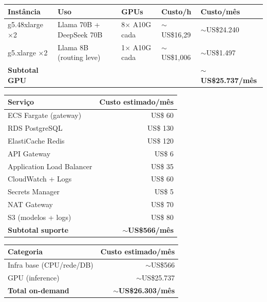 \documentclass[12pt,a4paper,]{abntex2}
\begin{document}
\begin{table}[h]
\centering
\begin{tabular}{|l|l|l|l|l|}
\hline
\textbf{Instância} & \textbf{Uso} & \textbf{GPUs} & \textbf{Custo/h} & \textbf{Custo/mês} \\
\hline
g5.48xlarge ×2 & Llama 70B + DeepSeek 70B & 8× A10G cada & $\sim$US\$16,29 & $\sim$US\$24.240 \\
g5.xlarge ×2 & Llama 8B (routing leve) & 1× A10G cada & $\sim$US\$1,006 & $\sim$US\$1.497 \\
\hline
\textbf{Subtotal GPU} & & & & \textbf{$\sim$US\$25.737/mês} \\
\hline
\end{tabular}
\end{table}

\begin{table}[h]
\centering
\begin{tabular}{|l|r|}
\hline
\textbf{Serviço} & \textbf{Custo estimado/mês} \\
\hline
ECS Fargate (gateway) & US\$ 60 \\
RDS PostgreSQL & US\$ 130 \\
ElastiCache Redis & US\$ 120 \\
API Gateway & US\$ 6 \\
Application Load Balancer & US\$ 35 \\
CloudWatch + Logs & US\$ 60 \\
Secrets Manager & US\$ 5 \\
NAT Gateway & US\$ 70 \\
S3 (modelos + logs) & US\$ 80 \\
\hline
\textbf{Subtotal suporte} & \textbf{$\sim$US\$566/mês} \\
\hline
\end{tabular}
\end{table}

\begin{table}[h]
\centering
\begin{tabular}{|l|r|}
\hline
\textbf{Categoria} & \textbf{Custo estimado/mês} \\
\hline
Infra base (CPU/rede/DB) & $\sim$US\$566 \\
GPU (inference) & $\sim$US\$25.737 \\
\hline
\textbf{Total on-demand} & \textbf{$\sim$US\$26.303/mês} \\
\hline
\end{tabular}
\end{table}
\end{document}
